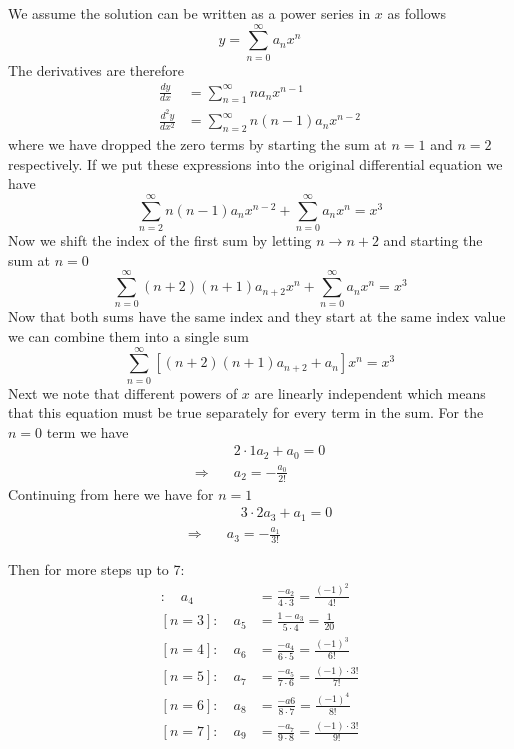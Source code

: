 \documentclass[letterpaper,twocolumn]{article}
\begin{document}
We assume the solution can be written as a power series 
in $x$ as follows
\begin{equation*}
y = \sum_{n=0}^\infty a_n x^n
\end{equation*}
The derivatives are therefore
\begin{align*}
\frac{dy}{dx} &= \sum_{n=1}^\infty n a_n x^{n-1} \\
\frac{d^2y}{dx^2} &= \sum_{n=2}^\infty n(n-1) a_n x^{n-2}
\end{align*}
where we have dropped the zero terms by starting the sum
at $n=1$ and $n=2$ respectively.
If we put these expressions into the original differential
equation we have
\begin{equation*}
\sum_{n=2}^\infty n(n-1) a_n x^{n-2} 
+ \sum_{n=0}^\infty a_n x^n = x^3
\end{equation*}
Now we shift the index of the first sum by letting 
$n \rightarrow n+2$ and starting the sum at $n=0$
\begin{equation*}
\sum_{n=0}^\infty (n+2)(n+1) a_{n+2} x^n 
+ \sum_{n=0}^\infty a_n x^n = x^3
\end{equation*}
Now that both sums have the same index and they start 
at the same index value we can combine them into a
single sum
\begin{equation*}
\sum_{n=0}^\infty \left[(n+2)(n+1) a_{n+2} + a_n \right] x^n = x^3
\end{equation*}
Next we note that different powers of $x$ are linearly 
independent which means that this equation must be true
separately for every term in the sum. For the $n=0$ term
we have
\begin{align*}
[n=0] &\quad 2 \cdot 1 a_2 + a_0 = 0 \\
\Longrightarrow & \quad \boxed{a_2 = - \frac{a_0}{2!}}
\end{align*}
Continuing from here we have for $n=1$
\begin{align*}
[n=1] &\quad 3 \cdot 2 a_3 + a_1 = 0 \\
\Longrightarrow \quad & \boxed{a_3 = - \frac{a_1}{3!}}
\end{align*}

Then for more steps up to 7:
\begin{align*}
        [n=2]: \quad  a_4 &=\frac{-a_2}{4\cdot3}=\frac{(-1)^2}{4!} \\
        [n=3]: \quad  a_5 &=\frac{1-a_3}{5\cdot4}=\frac{1}{20} \\
        [n=4]: \quad  a_6 &=\frac{-a_4}{6\cdot5}=\frac{(-1)^3}{6!}\\
        [n=5]: \quad  a_7 &=\frac{-a_5}{7\cdot6}=\frac{(-1)\cdot3!}{7!} \\
        [n=6]: \quad  a_8 &=\frac{-a6}{8\cdot7}=\frac{(-1)^4}{8!} \\
        [n=7]: \quad  a_9 &=\frac{-a_7}{9\cdot8}=\frac{(-1)\cdot3!}{9!}\\ 
\end{align*}
\end{document}
